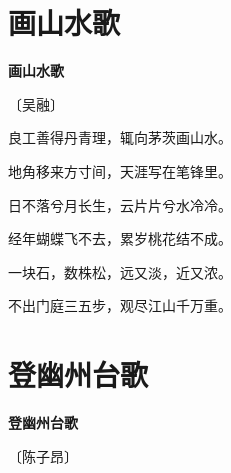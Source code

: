 \documentclass[12pt,UTF-8,openany,fontset=none]{ctexbook}
\begin{document}
\vspace{8pt}
\clearpage

\section{画山水歌}


\begin{center}
    {\bfseries 画山水歌}

    \vspace{18pt}

    \begin{large}\xuwen
        〔吴融〕
    \end{large}

\end{center}

    \vspace{18pt}  %

\begin{center}
    \begin{Large}

        良工善得丹青理，辄向茅茨画山水。

        地角移来方寸间，天涯写在笔锋里。

        日不落兮月长生，云片片兮水冷冷。

        经年蝴蝶飞不去，累岁桃花结不成。

        一块石，数株松，远又淡，近又浓。

        不出门庭三五步，观尽江山千万重。

    \end{Large}

\end{center}

\vspace{8pt}
\clearpage

\section{登幽州台歌}


\begin{center}
    {\bfseries 登幽州台歌}

    \vspace{18pt}

    \begin{large}\xuwen
        〔陈子昂〕
    \end{large}

\end{center}
\end{document}
